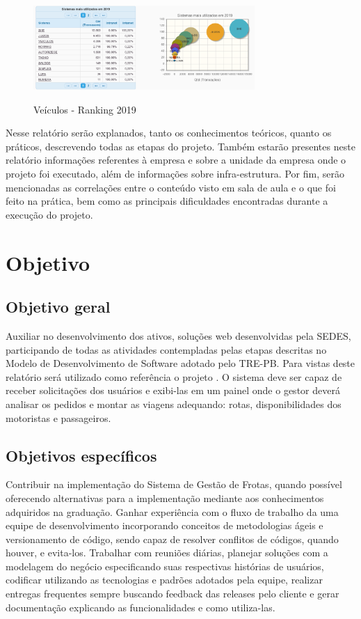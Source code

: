 \begin{figure}[!htb]
    \centering
    \caption{Veículos - Ranking 2019}
    \includegraphics[width=0.75\textwidth]{./dados/figuras/ranking2019.png}
    \label{fig:figura-ranking2019}
\end{figure}

Nesse relatório serão explanados, tanto os conhecimentos teóricos, quanto os práticos, descrevendo todas as etapas do projeto. Também estarão presentes neste relatório informações referentes à empresa e sobre a unidade da empresa onde o projeto foi executado, além de informações sobre infra-estrutura.
Por fim, serão mencionadas as correlações entre o conteúdo visto em sala de aula e o que foi feito na prática, bem como as principais dificuldades encontradas durante a execução do projeto.


\section{Objetivo}
\label{sec:objetivo}

\subsection{Objetivo geral}
\label{sec:objetivoGeral}
Auxiliar no desenvolvimento dos ativos, soluções web desenvolvidas pela SEDES, participando de todas as atividades contempladas pelas etapas descritas no Modelo de Desenvolvimento de Software adotado pelo TRE-PB.  Para vistas deste relatório será utilizado como referência o projeto \imprimirtitulo. O sistema deve ser capaz de receber solicitações dos usuários e exibi-las em um painel onde o gestor deverá analisar os pedidos e montar as viagens adequando: rotas, disponibilidades dos motoristas e passageiros.

\subsection{Objetivos específicos}
\label{sec:objetivosEspecificos}
Contribuir na implementação do Sistema de Gestão de Frotas, quando possível oferecendo alternativas para a implementação mediante aos conhecimentos adquiridos na graduação. Ganhar experiência com o fluxo de trabalho da uma equipe de desenvolvimento incorporando conceitos de metodologias ágeis e versionamento de código, sendo capaz de resolver conflitos de códigos, quando houver, e evita-los. Trabalhar com reuniões diárias, planejar soluções com a modelagem do negócio especificando suas respectivas histórias de usuários, codificar utilizando as tecnologias e padrões adotados pela equipe, realizar entregas frequentes sempre buscando feedback das releases pelo cliente e gerar documentação explicando as funcionalidades e como utiliza-las. 

